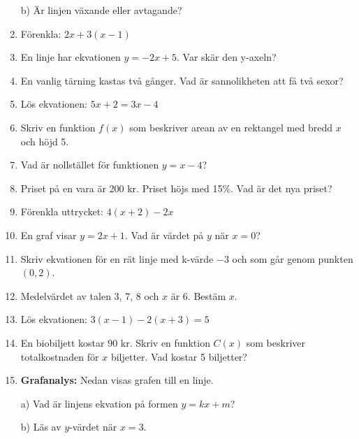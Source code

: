 \documentclass[a4paper,11pt]{article}
\begin{document}
\begin{enumerate}[label=\textbf{B\arabic*.}]
    b) Är linjen växande eller avtagande?

    \item Förenkla: $2x + 3(x - 1)$
    \item En linje har ekvationen $y = -2x + 5$. Var skär den y-axeln?
    \item En vanlig tärning kastas två gånger. Vad är sannolikheten att få två sexor?
    \item Lös ekvationen: $5x + 2 = 3x - 4$
    \item Skriv en funktion $f(x)$ som beskriver arean av en rektangel med bredd $x$ och höjd 5.
    \item Vad är nollstället för funktionen $y = x - 4$?
    \item Priset på en vara är 200 kr. Priset höjs med 15\%. Vad är det nya priset?
    \item Förenkla uttrycket: $4(x + 2) - 2x$
    \item En graf visar $y = 2x + 1$. Vad är värdet på $y$ när $x = 0$?
    \item Skriv ekvationen för en rät linje med k-värde $-3$ och som går genom punkten $(0,2)$.
    \item Medelvärdet av talen 3, 7, 8 och $x$ är 6. Bestäm $x$.
    \item Lös ekvationen: $3(x - 1) - 2(x + 3) = 5$
    \item En biobiljett kostar 90 kr. Skriv en funktion $C(x)$ som beskriver totalkostnaden för $x$ biljetter. Vad kostar 5 biljetter?
    \newpage
    \item \textbf{Grafanalys:} Nedan visas grafen till en linje.
    \begin{center}
    \end{center}
    a) Vad är linjens ekvation på formen $y = kx + m$?
    
    b) Läs av $y$-värdet när $x=3$.


\end{enumerate}
\end{document}
